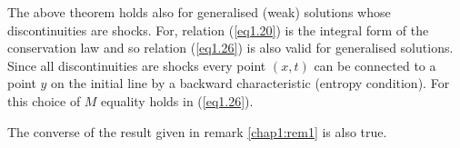 \begin{remark}\label{chap1:rem1}
The above theorem holds also for generalised (weak) solutions whose discontinuities are shocks. For, relation (\ref{eq1.20}) is the integral form of the conservation law and so relation (\ref{eq1.26}) is also valid for generalised solutions. Since all discontinuities are shocks every point $(x,t)$ can be connected to a point $y$ on the initial line by a backward characteristic (entropy condition). For this choice of $M$ equality holds in (\ref{eq1.26}). 
\end{remark}

\begin{remark}\label{chap1:rem2}
The converse of the result given in remark \ref{chap1:rem1} is also true. 
\end{remark}

